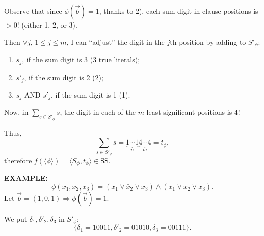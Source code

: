 Observe that since $\phi(\vec b)=1$, thanks to 2), each sum digit in clause positions is $>0$! (either 1, 2, or 3).

Then $\forall j$, $1\leq j\leq m$, I can ``adjust'' the digit in the $j$th position by adding to $S'_\phi$:
\begin{enumerate}
\item $s_j$, if the sum digit is 3 (3 true literals);
\item $s'_j$, if the sum digit is 2 (2);
\item $s_j$ AND $s'_j$, if the sum digit is 1 (1).
\end{enumerate}
Now, in $\sum_{s\in S'_\phi}s$, the digit in each of the $m$ least significant positions is 4!

Thus,
\[
\sum_{s\in S'_\phi}s=\underbrace{1\cdots1}_{n}\underbrace{4\cdots4}_{m}=t_\phi,
\]
therefore $f(\langle\phi\rangle)=\langle S_\phi,t_\phi\rangle\in\mathrm{SS}$.

\textbf{EXAMPLE:}
\[\phi(x_1,x_2,x_3)=(x_1\lor\bar x_2\lor x_3)\land(x_1\lor x_2\lor x_3).\]
Let $\vec b=(1,0,1)\Rightarrow\phi(\vec b)=1$.

We put $\delta_1,\delta'_2,\delta_3$ in $S'_\phi$:
\[\{\delta_1=10011,\delta'_2=01010,\delta_3=00111\}.\]
